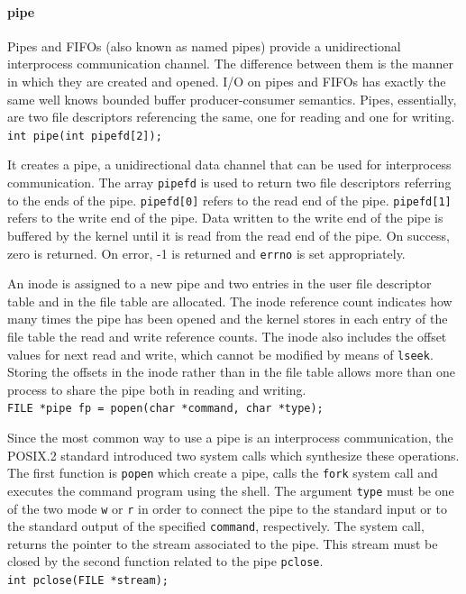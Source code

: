 \paragraph{pipe}
Pipes and FIFOs (also known as named pipes) provide a unidirectional interprocess communication channel. The difference between them is the manner in which they are created and opened. I/O on pipes and FIFOs has exactly the same well knows bounded buffer producer-consumer semantics. Pipes, essentially, are two file descriptors referencing the same, one for reading and one for writing.
\\
\texttt{int pipe(int pipefd[2]);}

It creates a pipe, a unidirectional data channel that can be used for interprocess communication. The array \texttt{pipefd} is used to return two file descriptors referring to the ends of the pipe. \texttt{pipefd[0]} refers to the read end of the pipe. \texttt{pipefd[1]} refers to the write end of the pipe. Data written to the write end of the pipe is buffered by the kernel until it is read from the read end of the pipe. On success, zero is returned. On error, -1 is returned and \texttt{errno} is set appropriately.

An inode is assigned to a new pipe and two entries in the user file descriptor table and in the file table are allocated. The inode reference count indicates how many times the pipe has been opened and the kernel stores in each entry of the file table the read and write reference counts. The inode also includes the offset values for next read and write, which cannot be modified by means of \texttt{lseek}. Storing the offsets in the inode rather than in the file table allows more than one process to share the pipe both in reading and writing.
\\
\texttt{FILE *pipe fp = popen(char *command, char *type);}

Since the most common way to use a pipe is an interprocess communication, the POSIX.2 standard introduced two system calls which synthesize these operations. The first function is \texttt{popen} which create a pipe, calls the \texttt{fork} system call and executes the command program using the shell. The argument \texttt{type} must be one of the two mode \texttt{w} or \texttt{r} in order to connect the pipe to the standard input or to the standard output of the specified \texttt{command}, respectively. The system call, returns the pointer to the stream associated to the pipe. This stream must be closed by the second function related to the pipe \texttt{pclose}.
\\
\texttt{int pclose(FILE *stream);}

